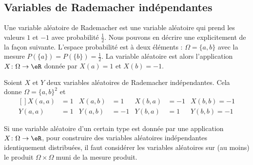 \subsection{Variables de Rademacher indépendantes}
\label{SUBSECooWOOGooVxflVZ}

Une variable aléatoire de Rademacher est une variable aléatoire qui prend les valeurs \( 1\) et \( -1\) avec probabilité \( \frac{ 1 }{2}\). Nous pouvons en décrire une explicitement de la façon suivante. L'espace probabilité est à deux éléments : \( \Omega=\{ a,b \}\) avec la mesure \( P(\{ a \})=P(\{ b \})=\frac{ 1 }{2}\). La variable aléatoire est alors l'application \( X\colon \Omega\to \eR\) donnée par \( X(a)=1\) et \( X(b)=-1\).

Soient \( X\) et \( Y\) deux variables aléatoires de Rademacher indépendantes. Cela donne \( \Omega=\{ a,b \}^2\) et
\begin{equation}
	\begin{aligned}[]
		X(a,a) & =1 & X(a,b) & =1  & X(b,a) & =-1 & X(b,b)=-1 \\
		Y(a,a) & =1 & Y(a,b) & =-1 & Y(b,a) & =1  & Y(b,b)=-1
	\end{aligned}
\end{equation}

\begin{remark}
	Si une variable aléatoire d'un certain type est donnée par une application \( X\colon \Omega\to \eR\), pour construire des variables aléatoires indépendantes identiquement distribuées, il faut considérer les variables aléatoires sur (au moins) le produit \( \Omega\times \Omega\) muni de la mesure produit.
\end{remark}

